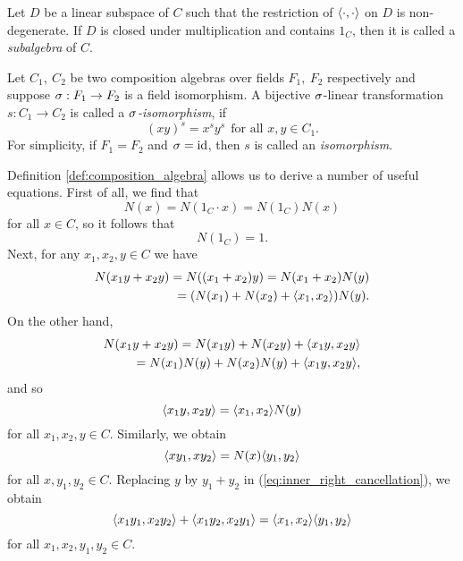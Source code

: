 Let $D$ be a linear subspace of $C$ such that the restriction of $\langle \cdot, \cdot \rangle$ on $D$ 
is non-degenerate. If $D$ is closed under multiplication and contains $1_C$, then it is called
a \textit{subalgebra} of $C$. 

Let $C_1,\ C_2$ be two composition algebras over fields $F_1,\ F_2$ respectively and 
suppose $\sigma: F_1 \rightarrow F_2$ is a field isomorphism. A bijective $\sigma$-linear transformation
$s : C_1 \rightarrow C_2$ is called a \textit{$\sigma$-isomorphism}, if 
\begin{equation}
	(xy)^s = x^s y^s\ \ \mbox{for all } x,y \in C_1. 
\end{equation}
For simplicity, if $F_1 = F_2$ and $\sigma = \mathrm{id}$, then $s$ is called an \textit{isomorphism}.

Definition \ref{def:composition_algebra} allows us to derive a number of useful equations. 
First of all, we find that
\begin{equation*}
	N( x ) = N( 1_C \cdot x ) = N(1_C) N(x)
\end{equation*}
for all $x \in C$, so it follows that
\begin{equation}
	N(1_C) = 1.
\end{equation}
Next, for any $x_1,x_2,y \in C$ we have
\begin{align*}
	N(x_1 y + x_2 y) = N((x_1+x_2) y) = N(x_1+x_2) N(y) \\
		= (N(x_1) + N(x_2) + \langle x_1, x_2 \rangle) N(y).
\end{align*}
On the other hand,
\begin{align*}
	N(x_1 y + x_2 y) = N(x_1 y) + N(x_2 y) + \langle x_1 y, x_2 y \rangle \\
		= N(x_1)N(y) + N(x_2)N(y) + \langle x_1 y, x_2 y \rangle,
\end{align*}
and so
\begin{equation}
	\label{eq:inner_right_cancellation}
	\langle x_1 y, x_2 y \rangle = \langle x_1, x_2 \rangle N(y)
\end{equation}
for all $x_1, x_2,y \in C$. Similarly, we obtain
\begin{equation}
	\langle x y_1, x y_2 \rangle = N(x)\langle y_1, y_2 \rangle
\end{equation}
for all $x,y_1,y_2 \in C$. Replacing $y$ by $y_1+y_2$ in 
(\ref{eq:inner_right_cancellation}), we obtain
\begin{equation}
	\langle x_1 y_1, x_2 y_2 \rangle + \langle x_1 y_2, x_2 y_1 \rangle = \langle x_1, x_2 \rangle \langle y_1, y_2 \rangle
\end{equation}
for all $x_1,x_2,y_1,y_2 \in C$. 

